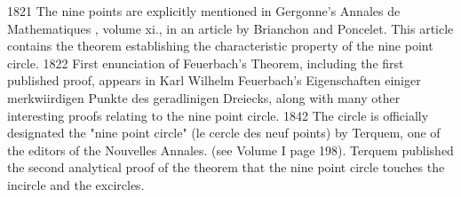 1821
The nine points are explicitly mentioned in Gergonne's Annales de Mathematiques , volume xi., in an article by Brianchon and Poncelet. This article contains the theorem establishing the characteristic property of the nine point circle.
1822
First enunciation of Feuerbach's Theorem, including the first published proof, appears in Karl Wilhelm Feuerbach's Eigenschaften einiger merkwiirdigen Punkte des geradlinigen Dreiecks, along with many other interesting proofs relating to the nine point circle.
1842
The circle is officially designated the "nine point circle" (le cercle des neuf points) by Terquem, one of the editors of the Nouvelles Annales. (see Volume I page 198). Terquem published the second analytical proof of the theorem that the nine point circle touches the incircle and the excircles.

%